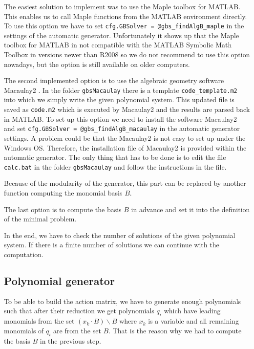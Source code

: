 The easiest solution to implement was to use the Maple toolbox for MATLAB. This enables us to call Maple functions from the MATLAB environment directly. To use this option we have to set \texttt{cfg.GBSolver = @gbs\_findAlgB\_maple} in the settings of the automatic generator. Unfortunately it shows up that the Maple toolbox for MATLAB in not compatible with the MATLAB Symbolic Math Toolbox in versions newer than R2008 so we do not recommend to use this option nowadays, but the option is still available on older computers.

The second implemented option is to use the algebraic geometry software Macaulay2 \cite{M2}. In the folder \texttt{gbsMacaulay} there is a template \texttt{code\_template.m2} into which we simply write the given polynomial system. This updated file is saved as \texttt{code.m2} which is executed by Macaulay2 and the results are parsed back in MATLAB. To set up this option we need to install the software Macaulay2 and set \texttt{cfg.GBSolver = @gbs\_findAlgB\_macaulay} in the automatic generator settings. A problem could be that the Macaulay2 is not easy to set up under the Windows OS. Therefore, the installation file of Macaulay2 is provided within the automatic generator. The only thing that has to be done is to edit the file \texttt{calc.bat} in the folder \texttt{gbsMacaulay} and follow the instructions in the file.

Because of the modularity of the generator, this part can be replaced by another function computing the monomial basis $B$.

The last option is to compute the basis $B$ in advance and set it into the definition of the minimal problem.

In the end, we have to check the number of solutions of the given polynomial system. If there is a finite number of solutions we can continue with the computation.

\subsection{Polynomial generator}
\label{subsec:polynomialGenerator}
To be able to build the action matrix, we have to generate enough polynomials such that after their reduction we get polynomials $q_i$ which have leading monomials from the set $\left(x_k \cdot B\right)\backslash B$ where $x_k$ is a variable and all remaining monomials of $q_i$ are from the set $B$. That is the reason why we had to compute the basis $B$ in the previous step.

